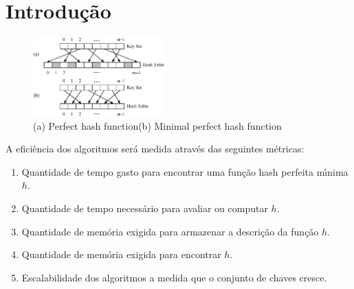\section{Introdu\c{c}\~ao}

\label{sec:introduction}
\begin{figure}
\centering
  \includegraphics[width=0.45\textwidth, height=0.3\textheight]{figs/minimalperfecthash-ph-mph.ps}
\caption{(a) Perfect hash function\quad  (b) Minimal perfect hash function}
\label{fig:minimalperfecthash-ph-mph}
\end{figure}

A efici\^encia dos algoritmos ser\'a medida atrav\'es das seguintes m\'etricas:
\begin{enumerate}
\item Quantidade de tempo gasto para encontrar uma fun\c{c}\~ao hash perfeita m\'{\i}nima $h$.
\item Quantidade de tempo necess\'ario para avaliar ou computar $h$.
\item Quantidade de mem\'oria exigida para armazenar a descri\c{c}\~ao da fun\c{c}\~ao $h$.
\item Quantidade de mem\'oria exigida para encontrar $h$.  
\item Escalabilidade dos algoritmos a medida que o conjunto de chaves cresce. 
\end{enumerate}

